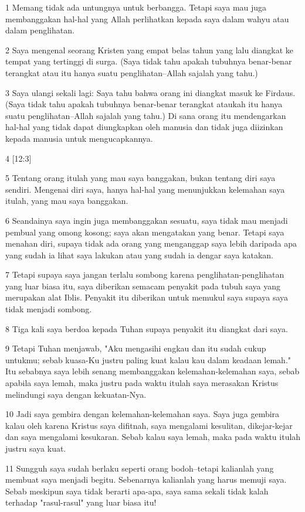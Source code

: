 \par 1 Memang tidak ada untungnya untuk berbangga. Tetapi saya mau juga membanggakan hal-hal yang Allah perlihatkan kepada saya dalam wahyu atau dalam penglihatan.
\par 2 Saya mengenal seorang Kristen yang empat belas tahun yang lalu diangkat ke tempat yang tertinggi di surga. (Saya tidak tahu apakah tubuhnya benar-benar terangkat atau itu hanya suatu penglihatan--Allah sajalah yang tahu.)
\par 3 Saya ulangi sekali lagi: Saya tahu bahwa orang ini diangkat masuk ke Firdaus. (Saya tidak tahu apakah tubuhnya benar-benar terangkat ataukah itu hanya suatu penglihatan--Allah sajalah yang tahu.) Di sana orang itu mendengarkan hal-hal yang tidak dapat diungkapkan oleh manusia dan tidak juga diizinkan kepada manusia untuk mengucapkannya.
\par 4 [12:3]
\par 5 Tentang orang itulah yang mau saya banggakan, bukan tentang diri saya sendiri. Mengenai diri saya, hanya hal-hal yang menunjukkan kelemahan saya itulah, yang mau saya banggakan.
\par 6 Seandainya saya ingin juga membanggakan sesuatu, saya tidak mau menjadi pembual yang omong kosong; saya akan mengatakan yang benar. Tetapi saya menahan diri, supaya tidak ada orang yang menganggap saya lebih daripada apa yang sudah ia lihat saya lakukan atau yang sudah ia dengar saya katakan.
\par 7 Tetapi supaya saya jangan terlalu sombong karena penglihatan-penglihatan yang luar biasa itu, saya diberikan semacam penyakit pada tubuh saya yang merupakan alat Iblis. Penyakit itu diberikan untuk memukul saya supaya saya tidak menjadi sombong.
\par 8 Tiga kali saya berdoa kepada Tuhan supaya penyakit itu diangkat dari saya.
\par 9 Tetapi Tuhan menjawab, "Aku mengasihi engkau dan itu sudah cukup untukmu; sebab kuasa-Ku justru paling kuat kalau kau dalam keadaan lemah." Itu sebabnya saya lebih senang membanggakan kelemahan-kelemahan saya, sebab apabila saya lemah, maka justru pada waktu itulah saya merasakan Kristus melindungi saya dengan kekuatan-Nya.
\par 10 Jadi saya gembira dengan kelemahan-kelemahan saya. Saya juga gembira kalau oleh karena Kristus saya difitnah, saya mengalami kesulitan, dikejar-kejar dan saya mengalami kesukaran. Sebab kalau saya lemah, maka pada waktu itulah justru saya kuat.
\par 11 Sungguh saya sudah berlaku seperti orang bodoh--tetapi kalianlah yang membuat saya menjadi begitu. Sebenarnya kalianlah yang harus memuji saya. Sebab meskipun saya tidak berarti apa-apa, saya sama sekali tidak kalah terhadap "rasul-rasul" yang luar biasa itu!
